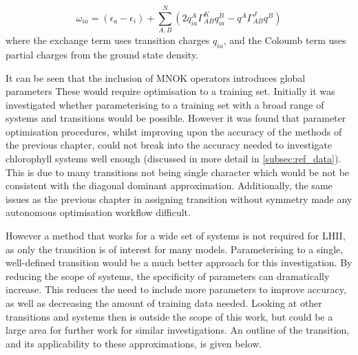 \begin{equation}
\omega_{ia} = \left(\epsilon_a - \epsilon_i\right) + \sum^N_{A,B}\left(2 q_{ia}^A \Gamma^K_{AB} q_{ia}^B - q^A \Gamma^J_{AB} q^B\right)
\end{equation}
%
where the exchange term uses transition charges $q_{ia}$, and the Coloumb term uses
partial charges from the ground state density.

It can be seen that the inclusion of MNOK operators introduces global parameters
These would require optimisation to a training set. Initially it was investigated
whether parameterising to a training set with a broad range of systems and transitions
would be possible. However it was found that parameter optimisation procedures, 
whilst improving upon the accuracy of the \dxtb methods of the previous chapter,
could not break into the accuracy needed to investigate chlorophyll systems well
enough (discussed in more detail in \ref{subsec:ref_data}). This is due to many
transitions not being single character which would be not be consistent with the
diagonal dominant approximation. Additionally, the same issues as the previous 
chapter in assigning transition without symmetry made any autonomous optimisation
workflow difficult.

However a method that works for a wide set of systems is not required for LHII,
as only the \Qy transition is of interest for many models. Parameterising to a 
single, well-defined transition would be a much better approach for this investigation.
By reducing the scope of systems, the specificity of parameters can dramatically increase. 
This reduces the need to include more parameters to improve accuracy, as well as 
decreasing the amount of training data needed. Looking at other transitions and
systems then is outside the scope of this work, but could be a large area for further
work for similar investigations. An outline of the \Qy transition, and its applicability
to these approximations, is given below.

